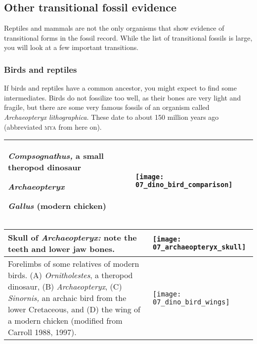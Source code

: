 \documentclass[12pt, hidelinks]{exam}
\begin{document}
\subsection*{Other transitional fossil evidence}

Reptiles and mammals are not the only organisms that show evidence of transitional forms in the fossil record. While the list of transitional fossils is large, you will look at a few important transitions.

\subsubsection*{Birds and reptiles }

If birds and reptiles have a common ancestor, you might expect to find
some intermediates. Birds do not fossilize too well, as their bones are
very light and fragile, but there are some very famous fossils of an
organism called \textit{Archaeopteryx lithographica.} These date to about
150 million years ago (abbreviated \textsc{mya} from here on).

\begin{tabular}[t]{@{}L{0.3\textwidth}R{0.65\textwidth}@{}}

\toprule

\textit{Compsognathus,} a small
theropod dinosaur

\vspace*{6\baselineskip}

\textit{Archaeopteryx}

\vspace*{7\baselineskip}

\textit{Gallus} (modern chicken)

\vfill 
 &

\texttt{[image: 07\_dino\_bird\_comparison]}\\
\bottomrule
\end{tabular}


\newpage

\begin{tabular}{@{}L{0.45\textwidth}R{0.5\textwidth}@{}}

\toprule
Skull of \textit{Archaeopteryx:} note the teeth and lower jaw bones. &

\texttt{[image: 07\_archaeopteryx\_skull]} \\

\midrule

Forelimbs of some relatives of modern birds. 
(A) \textit{Ornitholestes}, a theropod dinosaur, 
(B) \textit{Archaeopteryx}, (C) \textit{Sinornis,} an archaic bird from 
the lower Cretaceous, and (D) the wing of a modern chicken (modified 
from Carroll 1988, 1997). &

\texttt{[image: 07\_dino\_bird\_wings]}\\
\bottomrule
\end{tabular}
\end{document}
